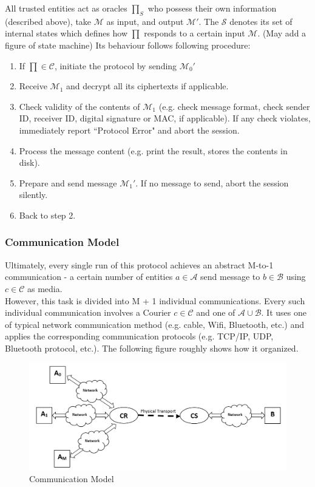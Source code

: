\documentclass[10pt,a4paper]{article}
\begin{document}
All trusted entities act as oracles $\prod_S$ who possess their own information (described above), take $\mathcal{M}$ as input, and output $\mathcal{M'}$. The $\mathcal{S}$ denotes its set of internal states which defines how $\prod$ responds to a certain input $\mathcal{M}$. (May add a figure of state machine) Its behaviour follows following procedure:
\begin{enumerate}
\item If $\prod \in \mathcal{C}$, initiate the protocol by sending ${\mathcal{M}_0}'$
\item Receive $\mathcal{M}_1$ and decrypt all its ciphertexts if applicable.
\item Check validity of the contents of $\mathcal{M}_1$ (e.g. check message format, check sender ID, receiver ID, digital signature or MAC, if applicable). If any check violates, immediately report ``Protocol Error" and abort the session.
\item Process the message content (e.g. print the result, stores the contents in disk).
\item Prepare and send message ${\mathcal{M}_1}'$. If no message to send, abort the session silently.
\item Back to step 2.
\end{enumerate}

\subsubsection*{Communication Model}
Ultimately, every single run of this protocol achieves an abstract M-to-1 communication - a certain number of entities $a \in \mathcal{A}$ send message to $b \in \mathcal{B}$ using $c \in \mathcal{C}$ as media. \\
However, this task is divided into M + 1 individual communications. Every such individual communication involves a Courier $c \in \mathcal{C}$ and one of $\mathcal{A} \cup \mathcal{B}$. It uses one of typical network communication method (e.g. cable, Wifi, Bluetooth, etc.) and applies the corresponding communication protocols (e.g. TCP/IP, UDP, Bluetooth protocol, etc.). The following figure roughly shows how it organized.

\begin{figure}[h!]
\includegraphics[width=\textwidth,natwidth=1263,natheight=256]{communicationmodel.png}
\caption{Communication Model}
\end{figure}
\end{document}
